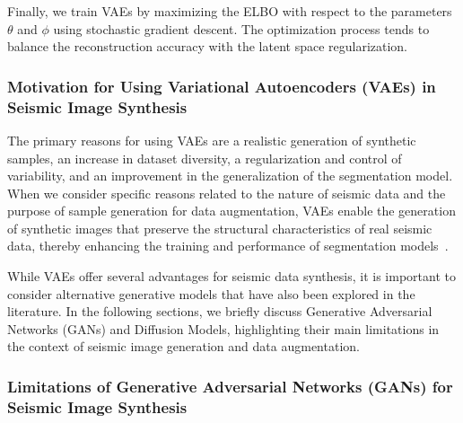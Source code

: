 \documentclass{ieeeaccess}
\begin{document}
Finally, we train VAEs by maximizing the ELBO with respect to the parameters $\theta$ and $\phi$ using stochastic gradient descent. The optimization process tends to balance the reconstruction accuracy with the latent space regularization.


\subsubsection{Motivation for Using Variational Autoencoders (VAEs) in Seismic Image Synthesis}

The primary reasons for using VAEs are a realistic generation of synthetic samples, an increase in dataset diversity, a regularization and control of variability, and an improvement in the generalization of the segmentation model. When we consider specific reasons related to the nature of seismic data and the purpose of sample generation for data augmentation, VAEs enable the generation of synthetic images that preserve the structural characteristics of real seismic data, thereby enhancing the training and performance of segmentation models~\cite{Henriques2021,Wang2021,Anjom2024}.

While VAEs offer several advantages for seismic data synthesis, it is important to consider alternative generative models that have also been explored in the literature. In the following sections, we briefly discuss Generative Adversarial Networks (GANs) and Diffusion Models, highlighting their main limitations in the context of seismic image generation and data augmentation.

\subsubsection{Limitations of Generative Adversarial Networks (GANs) for Seismic Image Synthesis}
\end{document}
